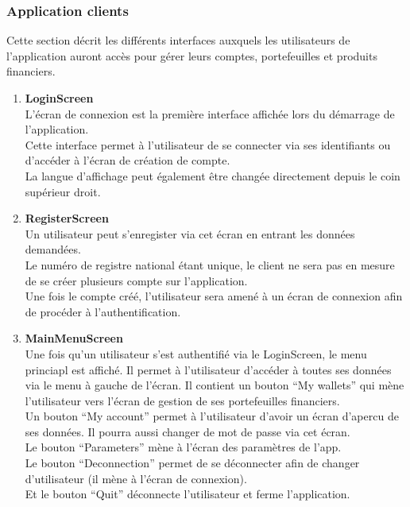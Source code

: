 \documentclass{article}
\begin{document}
\subsubsection{Application clients}
Cette section décrit les différents interfaces auxquels les utilisateurs de l'application auront accès pour gérer leurs comptes, portefeuilles et produits financiers.\\

\begin{enumerate}
\item \textbf{LoginScreen} \\ 
L'écran de connexion est la première interface affichée lors du démarrage de l'application.\\
Cette interface permet à l'utilisateur de se connecter via ses identifiants ou d'accéder à l'écran de création de compte.\\
La langue d'affichage peut également être changée directement depuis le coin supérieur droit.

\item \textbf{RegisterScreen} \\
Un utilisateur peut s'enregister via cet écran en entrant les données demandées.\\
Le numéro de registre national étant unique, le client ne sera pas en mesure de se créer plusieurs compte sur l'application.\\
Une fois le compte créé, l'utilisateur sera amené à un écran de connexion afin de procéder à l'authentification.

\item \textbf{MainMenuScreen} \\
Une fois qu'un utilisateur s'est authentifié via le LoginScreen, le menu princiapl est affiché. Il permet à l'utilisateur d'accéder à toutes ses données via le menu à 
gauche de l'écran. Il contient un bouton ``My wallets'' qui mène l'utilisateur vers l'écran de gestion de ses portefeuilles financiers.\\
Un bouton ``My account'' permet à l'utilisateur d'avoir un écran d'apercu de ses données. Il pourra aussi changer de mot de passe via cet écran.\\
Le bouton ``Parameters'' mène à l'écran des paramètres de l'app.\\
Le bouton ``Deconnection'' permet de se déconnecter afin de changer d'utilisateur (il mène à l'écran de connexion).\\
Et le bouton ``Quit'' déconnecte l'utilisateur et ferme l'application.


\end{enumerate}
\end{document}
